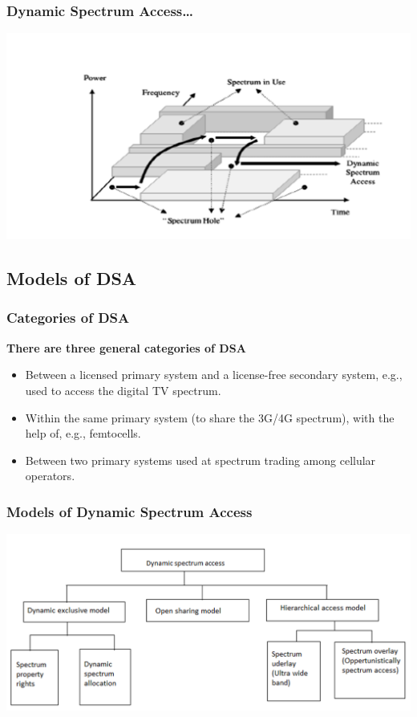 \documentclass{beamer}
\begin{document}
\begin{frame}
\frametitle{Dynamic Spectrum Access\dots}
\includegraphics[scale=0.5]{dsa}

\end{frame}



\subsection{Models of DSA}
\begin{frame}
\frametitle{Categories of DSA}
\textbf{There are three general categories of DSA}
\begin{itemize}
\item Between a licensed primary system and a license-free secondary system, e.g., used to access the digital TV spectrum.
\item Within the same primary system (to share the 3G/4G spectrum), with the help of, e.g., femtocells.
\item Between two primary systems used at spectrum trading among cellular operators.
\end{itemize}

\end{frame}
\begin{frame}
\frametitle{Models of Dynamic Spectrum Access}
\includegraphics[scale=0.5]{models}
\end{frame}
\end{document}
